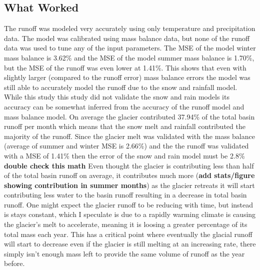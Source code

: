 \documentclass{article}
\begin{document}
\subsection{What Worked}
The runoff was modeled very accurately using only temperature and precipitation data. The model was calibrated using mass balance data, but 
none of the runoff data was used to tune any of the input parameters. The MSE of the model winter mass balance is 3.62\% and the MSE of the 
model summer mass balance is 1.70\%, but the MSE of the runoff was even lower at 1.41\%. This shows that even with slightly larger (compared 
to the runoff error) mass balance errors the model was still able to accurately model the runoff due to the snow and rainfall model. 
While this study this study did not validate the snow and rain models its accuracy can be somewhat inferred from the accuracy of the runoff 
model and mass balance model. On average the glacier contributed 37.94\% of the total basin runoff per month which means that the snow melt 
and rainfall contributed the majority of the runoff. Since the glacier melt was validated with the mass balance (average of summer and winter 
MSE is 2.66\%) and the the runoff was validated with a MSE of 1.41\% then the error of the snow and rain model must be 2.8\% \textbf{double 
check this math}
Even thought the glacier is contributing less than half of the total basin runoff on average, it contributes much more (\textbf{add 
stats/figure showing contribution in summer months}) as the glacier retreats it will start contributing less water to the basin runoff resulting in a decrease in total 
basin runoff. One might expect the glacier runoff to be reducing with time, but instead is stays constant, which I speculate is due to a 
rapidly warming climate is causing the glacier's melt to accelerate, meaning it is loosing a greater percentage of its total mass each year. 
This has a critical point where eventually the glacial runoff will start to decrease even if the glacier is still melting at an increasing 
rate, there simply isn't enough mass left to provide the same volume of runoff as the year before.
\end{document}
